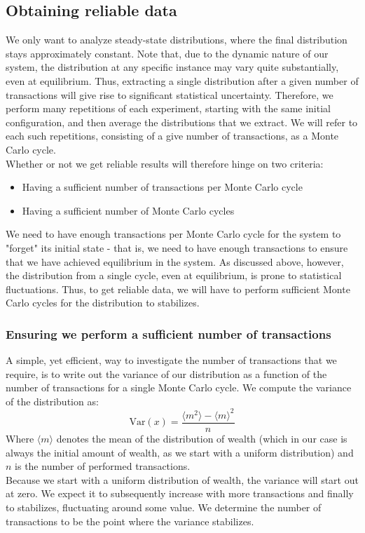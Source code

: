 \documentclass[a4paper, 10pt]{article}
\begin{document}
\subsection{Obtaining reliable data}
We only want to analyze steady-state distributions, where the final distribution stays approximately constant. Note that, due to the dynamic nature of our system, the distribution at any specific instance may vary quite substantially, even at equilibrium. Thus, extracting a single distribution after a given number of transactions will give rise to significant statistical uncertainty. Therefore, we perform many repetitions of each experiment, starting with the same initial configuration, and then average the distributions that we extract. We will refer to each such repetitions, consisting of a give number of transactions, as a Monte Carlo cycle.\\
\linebreak
Whether or not we get reliable results will therefore hinge on two criteria:
\begin{itemize}
\item Having a sufficient number of transactions per Monte Carlo cycle
\item Having a sufficient number of Monte Carlo cycles
\end{itemize}
We need to have enough transactions per Monte Carlo cycle for the system to "forget" its initial state - that is, we need to have enough transactions to ensure that we have achieved equilibrium in the system. As discussed above, however, the distribution from a single cycle, even at equilibrium, is prone to statistical fluctuations. Thus, to get reliable data, we will have to perform sufficient Monte Carlo cycles for the distribution to stabilizes.\\
\subsubsection{Ensuring we perform a sufficient number of transactions}
A simple, yet efficient, way to investigate the number of transactions that we require, is to write out the variance of our distribution as a function of the number of transactions for a single Monte Carlo cycle. We compute the variance of the distribution as:
\begin{equation}
\mathrm{Var}(x)=\frac{\langle m^2 \rangle - \langle m \rangle^2 }{n}
\end{equation}
Where $\langle m \rangle$ denotes the mean of the distribution of wealth (which in our case is always the initial amount of wealth, as we start with a uniform distribution) and $n$ is the number of performed transactions.\\
\linebreak
Because we start with a uniform distribution of wealth, the variance will start out at zero. We expect it to subsequently increase with more transactions and finally to stabilizes, fluctuating around some value. We determine the number of transactions to be the point where the variance stabilizes.
\end{document}
